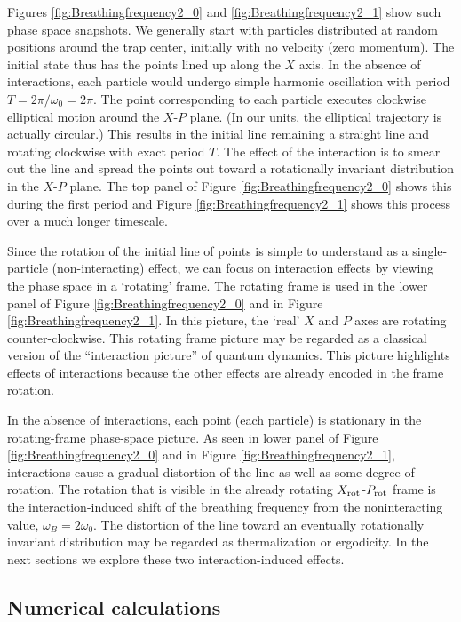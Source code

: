 \documentclass[a4paper, onecolumn]{revtex4-1}
\begin{document}
Figures \ref{fig:Breathingfrequency2_0} and \ref{fig:Breathingfrequency2_1} show such phase space
snapshots.  We generally start with particles distributed at random positions around the trap
center, initially with no velocity (zero momentum).  The initial state thus has the points lined up
along the $X$ axis.  In the absence of interactions, each particle would undergo simple harmonic
oscillation with period $T=2\pi/\omega_0 = 2\pi$.  The point corresponding to each particle executes
clockwise elliptical motion around the $X$-$P$ plane.  (In our units, the elliptical trajectory is
actually circular.)  This results in the initial line remaining a straight line and rotating
clockwise with exact period $T$.  The effect of the interaction is to smear out the line and spread
the points out toward a rotationally invariant distribution in the $X$-$P$ plane.  The top panel of
Figure \ref{fig:Breathingfrequency2_0} shows this during the first period and Figure
\ref{fig:Breathingfrequency2_1} shows this process over a much longer timescale.

Since the rotation of the initial line of points is simple to understand as a single-particle
(non-interacting) effect, we can focus on interaction effects by viewing the phase space in a
`rotating' frame.  The rotating frame is used in the lower panel of Figure
\ref{fig:Breathingfrequency2_0} and in Figure \ref{fig:Breathingfrequency2_1}.  In this picture, the
`real' $X$ and $P$ axes are rotating counter-clockwise.  This rotating frame picture may be regarded
as a classical version of the ``interaction picture'' of quantum dynamics.  This picture highlights
effects of interactions because the other effects are already encoded in the frame rotation.

In the absence of interactions, each point (each particle) is stationary in the rotating-frame
phase-space picture.  As seen in lower panel of Figure \ref{fig:Breathingfrequency2_0} and in Figure
\ref{fig:Breathingfrequency2_1}, interactions cause a gradual distortion of the line as well as some
degree of rotation.
%
The rotation that is visible in the already rotating $X_{\rm rot}$-$P_{\rm rot}$ frame is the
interaction-induced shift of the breathing frequency from the noninteracting value,
$\omega_B=2\omega_0$.  The distortion of the line toward an eventually rotationally invariant
distribution may be regarded as thermalization or ergodicity.  In the next sections we explore these
two interaction-induced effects.




\subsection{Numerical calculations}
\end{document}
